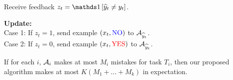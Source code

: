\documentclass[landscape,a0a,final]{a0poster}
\begin{document}
\begin{multicols}{3}
\begin{minipage}{0.58\linewidth}
{    %
    Receive feedback $z_t = \indicator{\widehat{y}_t \neq y_t}$.
   \begin{framed}
    \textbf{Update:}\\
    {\color{red} Case 1}: If $z_t = 1$, send example $(x_t, {\color{blue} \text{NO}})$ to $\mathcal{A}_{\widehat{y}_t}$.\\
    {\color{blue} Case 2}: If $z_t = 0$, send example $(x_t, {\color{red} \text{YES}})$ to $\mathcal{A}_{\widehat{y}_t}$.
  \end{framed}
  }

\end{minipage}

\vspace*{0.5cm}
\begin{theorem}
If for each $i$, $\mathcal{A}_i$ makes at most $M_i$ mistakes for task $T_i$, then
our proposed algorithm makes at most $K(M_1 + \ldots + M_k)$ in expectation.
\end{theorem}

\vspace*{0.5cm}

\end{multicols}
\end{document}
